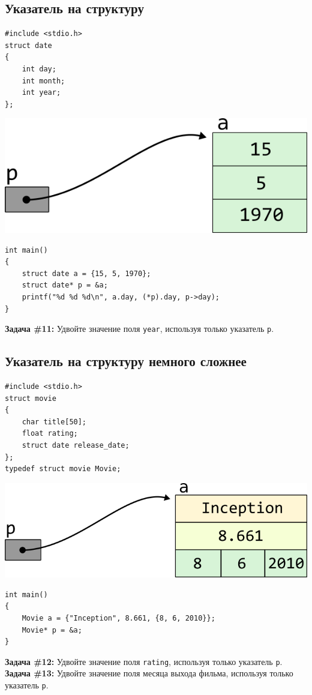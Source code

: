\documentclass{article}
\begin{document}
\subsection*{Указатель на структуру}
\begin{multicols}{2}
\begin{lstlisting}
#include <stdio.h>
struct date
{
	int day;
	int month;
	int year;
};
\end{lstlisting}
\columnbreak
\includegraphics[scale=1]{../images/pointer_schemes/pointer_to_struct_date.png}
\end{multicols}
\vspace{-5ex}
\begin{lstlisting}
int main()
{
	struct date a = {15, 5, 1970};
	struct date* p = &a;
	printf("%d %d %d\n", a.day, (*p).day, p->day);
}
\end{lstlisting}
\textbf{Задача \#11:} Удвойте значение поля \texttt{year}, используя только указатель \texttt{p}.

\subsection*{Указатель на структуру немного сложнее}
\begin{multicols}{2}
\begin{lstlisting}
#include <stdio.h>
struct movie
{
    char title[50];
    float rating;
    struct date release_date;
};
typedef struct movie Movie;
\end{lstlisting}
\columnbreak
\begin{center}
\includegraphics[scale=1]{../images/pointer_schemes/pointer_to_struct_movie.png}
\end{center}
\end{multicols}
\begin{lstlisting}
int main()
{
	Movie a = {"Inception", 8.661, {8, 6, 2010}};
	Movie* p = &a;
}
\end{lstlisting}
\textbf{Задача \#12:} Удвойте значение поля \texttt{rating}, используя только указатель \texttt{p}.\\
\textbf{Задача \#13:} Удвойте значение поля месяца выхода фильма, используя только указатель \texttt{p}.
\end{document}
